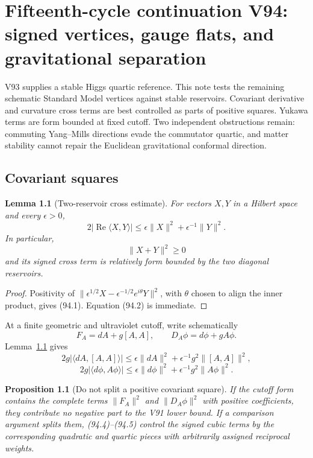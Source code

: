 \documentclass[11pt]{article}
\newtheorem{proposition}[theorem]{Proposition}
\newtheorem{lemma}[theorem]{Lemma}
\theoremstyle{remark}
\begin{document}
\chapter{Fifteenth-cycle continuation V94: signed vertices, gauge flats, and gravitational separation}
\label{sec:v15v94}

V93 supplies a stable Higgs quartic reference.  This note tests the
remaining schematic Standard Model vertices against stable
reservoirs.  Covariant derivative and curvature cross terms are
best controlled as parts of positive squares.  Yukawa terms are
form bounded at fixed cutoff.  Two independent obstructions remain:
commuting Yang--Mills directions evade the commutator quartic, and
matter stability cannot repair the Euclidean gravitational
conformal direction.

\section{Covariant squares}

\begin{lemma}[Two-reservoir cross estimate]
\label{lem:v15v94-square}
For vectors \(X,Y\) in a Hilbert space and every \(\epsilon>0\),
\[
 2|\operatorname{Re}\langle X,Y\rangle|
 \leq\epsilon\|X\|^2+\epsilon^{-1}\|Y\|^2.            \tag{94.1}
\]
In particular,
\[
 \|X+Y\|^2\geq0                                       \tag{94.2}
\]
and its signed cross term is relatively form bounded by the two
diagonal reservoirs.
\end{lemma}

\begin{proof}
Positivity of
\(\|\epsilon^{1/2}X-\epsilon^{-1/2}e^{i\theta}Y\|^2\),
with \(\theta\) chosen to align the inner product, gives (94.1).
Equation (94.2) is immediate.
\end{proof}

At a finite geometric and ultraviolet cutoff, write schematically
\[
 F_A=dA+g[A,A],\qquad D_A\phi=d\phi+gA\phi.            \tag{94.3}
\]
Lemma~\ref{lem:v15v94-square} gives
\[
 2g|\langle dA,[A,A]\rangle|
 \leq\epsilon\|dA\|^2+\epsilon^{-1}g^2\|[A,A]\|^2,    \tag{94.4}
\]
\[
 2g|\langle d\phi,A\phi\rangle|
 \leq\epsilon\|d\phi\|^2+\epsilon^{-1}g^2\|A\phi\|^2. \tag{94.5}
\]

\begin{proposition}[Do not split a positive covariant square]
\label{prop:v15v94-covariant}
If the cutoff form contains the complete terms
\(\|F_A\|^2\) and \(\|D_A\phi\|^2\) with positive coefficients,
they contribute no negative part to the V91 lower bound.  If a
comparison argument splits them, (94.4)--(94.5) control the signed
cubic terms by the corresponding quadratic and quartic pieces with
arbitrarily assigned reciprocal weights.
\end{proposition}
\end{document}

